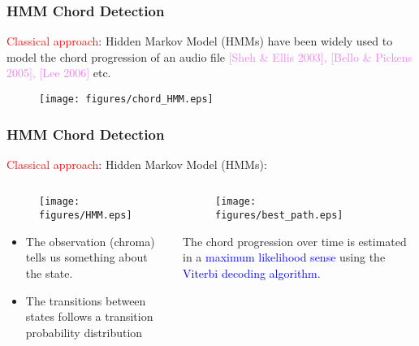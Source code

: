 \documentclass[12pt]{beamer}
\begin{document}



\begin{frame}
\frametitle{HMM Chord Detection}

\textcolor{red}{Classical approach}: Hidden Markov Model (HMMs) have been widely used to model the chord progression of an audio file \textcolor{violet}{[Sheh $\&$ Ellis 2003], [Bello $\&$ Pickens 2005], [Lee 2006]} etc.
\vspace{-0.4cm} 

\vspace{-0.4cm}
\hspace{-0.4cm}
 \begin{figure}[htb]
   \centering 
   \texttt{[image: figures/chord\_HMM.eps]}
\end{figure}
\end{frame}

\begin{frame}
\frametitle{HMM Chord Detection} 

\textcolor{red}{Classical approach}: Hidden Markov Model (HMMs): 

\begin{columns}[c] 

\begin{column}{0.6\textwidth} 
\vspace{-0.4cm}
\begin{figure}[htb]
   \centering
   \texttt{[image: figures/HMM.eps]}
\end{figure}
\begin{itemize}	
\item The observation (chroma) tells us something about the state.
\item The transitions between states follows a transition probability distribution
\end{itemize}

\end{column} 


\begin{column}{0.4\textwidth} 
\vspace{-0.5cm}
\begin{figure}[htb]
   \centering
   \texttt{[image: figures/best\_path.eps]}
\end{figure}
The chord progression over time is estimated in a \textcolor{blue}{maximum likelihood sense} using the \textcolor{blue}{Viterbi decoding algorithm}.
\end{column} 

\end{columns} 


\end{frame}
\end{document}
